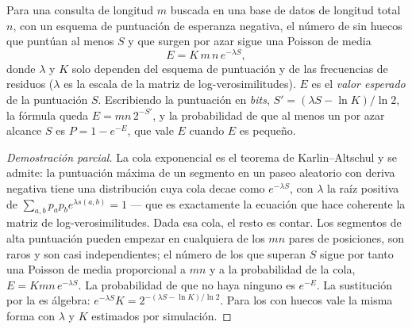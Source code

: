 \begin{theorem}\label{thm:b3:bioinformatics:evalue}
Para una consulta de longitud $m$ buscada en una base de datos de
longitud total $n$, con un esquema de puntuación de esperanza negativa,
el número de  sin huecos que puntúan al menos $S$ y
que surgen por azar sigue una Poisson de media
\[
E = K\,m\,n\,e^{-\lambda S},
\]
donde $\lambda$ y $K$ solo dependen del esquema de puntuación y de las
frecuencias de residuos ($\lambda$ es la escala de la matriz de
log-verosimilitudes). $E$ es el \emph{valor esperado} de la puntuación
$S$. Escribiendo la puntuación en \emph{bits},
$S' = (\lambda S - \ln K)/\ln 2$, la fórmula queda $E = m n\, 2^{-S'}$,
y la probabilidad de que
al menos un  por azar alcance $S$ es $P = 1 - e^{-E}$, que
vale $E$ cuando $E$ es pequeño.
\end{theorem}
\begin{proof}[Demostración parcial]
La cola exponencial es el teorema de Karlin--Altschul y se admite: la
puntuación máxima de un segmento en un paseo aleatorio con deriva
negativa tiene una distribución cuya cola decae como $e^{-\lambda S}$,
con $\lambda$ la raíz positiva de
$\sum_{a,b} p_{a} p_{b} e^{\lambda s(a,b)} = 1$ --- que es exactamente la
ecuación que hace coherente la matriz de log-verosimilitudes. Dada esa
cola, el resto es contar. Los segmentos de alta puntuación pueden empezar
en cualquiera de los $mn$ pares de posiciones, son raros y son casi
independientes; el número de los que superan $S$ sigue por tanto una
Poisson de media proporcional a $mn$ y a la probabilidad de la cola,
$E = Kmn\,e^{-\lambda S}$. La probabilidad de que no haya ninguno es
$e^{-E}$. La sustitución por la  es álgebra:
$e^{-\lambda S} K = 2^{-(\lambda S -
\ln K)/\ln 2}$. Para los  con huecos vale la misma forma con
$\lambda$ y $K$ estimados por simulación.
\end{proof}

